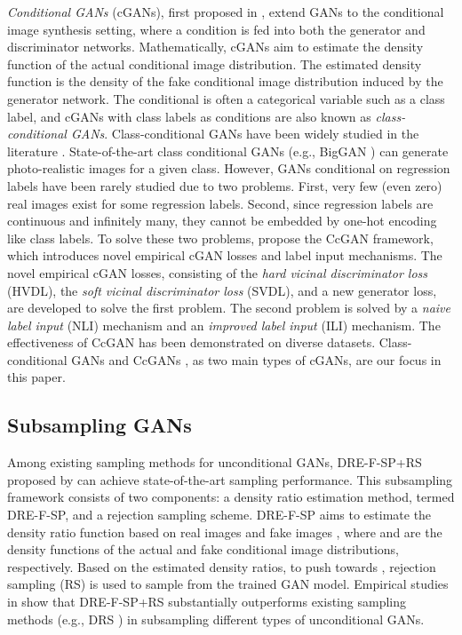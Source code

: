 \documentclass[final,12pt, 3p,times]{elsarticle}
\begin{document}
\textit{Conditional GANs} (cGANs), first proposed in \cite{mirza2014conditional}, extend GANs \cite{goodfellow2014generative} to the conditional image synthesis setting, where a condition  is fed into both the generator and discriminator networks. Mathematically, cGANs aim to estimate the density function  of the actual conditional image distribution. The estimated density function  is the density of the fake conditional image distribution induced by the generator network. The conditional  is often a categorical variable such as a class label, and cGANs with class labels as conditions are also known as \textit{class-conditional GANs}. Class-conditional GANs have been widely studied in the literature \cite{odena2017conditional, miyato2018cgans, brock2018large, zhang2019self}. State-of-the-art class conditional GANs (e.g., BigGAN \cite{brock2018large}) can generate photo-realistic images for a given class. However, GANs conditional on regression labels have been rarely studied due to two problems. First, very few (even zero) real images exist for some regression labels. Second, since regression labels are continuous and infinitely many, they cannot be embedded by one-hot encoding like class labels. To solve these two problems, \cite{ding2021ccgan, ding2020continuous} propose the CcGAN framework, which introduces novel empirical cGAN losses and label input mechanisms. The novel empirical cGAN losses, consisting of the \textit{hard vicinal discriminator loss} (HVDL), the \textit{soft vicinal discriminator loss} (SVDL), and a new generator loss, are developed to solve the first problem. The second problem is solved by a \textit{naive label input} (NLI) mechanism and an \textit{improved label input} (ILI) mechanism. The effectiveness of CcGAN has been demonstrated on diverse datasets. Class-conditional GANs \cite{odena2017conditional, miyato2018cgans, brock2018large, zhang2019self} and CcGANs \cite{ding2021ccgan, ding2020continuous}, as two main types of cGANs, are our focus in this paper.





\subsection{Subsampling GANs}\label{sec:related_DRE-F-SP}

Among existing sampling methods for unconditional GANs, DRE-F-SP+RS proposed by \cite{ding2020subsampling} can achieve state-of-the-art sampling performance. This subsampling framework consists of two components: a density ratio estimation method, termed DRE-F-SP, and a rejection sampling scheme. DRE-F-SP aims to estimate the density ratio function  based on  real images  and  fake images , where  and  are the density functions of the actual and fake conditional image distributions, respectively. Based on the estimated density ratios, to push  towards , rejection sampling (RS) is used to sample from the trained GAN model. Empirical studies in \cite{ding2020subsampling} show that DRE-F-SP+RS substantially outperforms existing sampling methods (e.g., DRS \cite{azadi2018discriminator}) in subsampling different types of unconditional GANs. 
\end{document}
